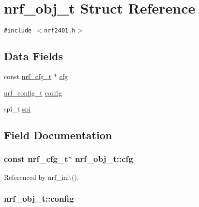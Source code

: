\hypertarget{structnrf__obj__t}{
\section{nrf\_\-obj\_\-t Struct Reference}
\label{structnrf__obj__t}
}
{\tt \#include $<$nrf2401.h$>$}

\subsection*{Data Fields}
\begin{CompactItemize}
\item 
const \hyperlink{structnrf__cfg__t}{nrf\_\-cfg\_\-t} $\ast$ \hyperlink{structnrf__obj__t_8a197bd17720bd674bd0740549204312}{cfg}
\item 
\hyperlink{unionnrf__config__t}{nrf\_\-config\_\-t} \hyperlink{structnrf__obj__t_b4250f3d6bd057f55275e4684adc8c53}{config}
\item 
spi\_\-t \hyperlink{structnrf__obj__t_68e34d6c3812594732d7e4edce10053e}{spi}
\end{CompactItemize}


\subsection{Field Documentation}
\hypertarget{structnrf__obj__t_8a197bd17720bd674bd0740549204312}{
\subsubsection{\setlength{\rightskip}{0pt plus 5cm}const {\bf nrf\_\-cfg\_\-t}$\ast$ {\bf nrf\_\-obj\_\-t::cfg}}}
\label{structnrf__obj__t_8a197bd17720bd674bd0740549204312}




Referenced by nrf\_\-init().\hypertarget{structnrf__obj__t_b4250f3d6bd057f55275e4684adc8c53}{
\subsubsection{ {\bf nrf\_\-obj\_\-t::config}}}
\label{structnrf__obj__t_b4250f3d6bd057f55275e4684adc8c53}




